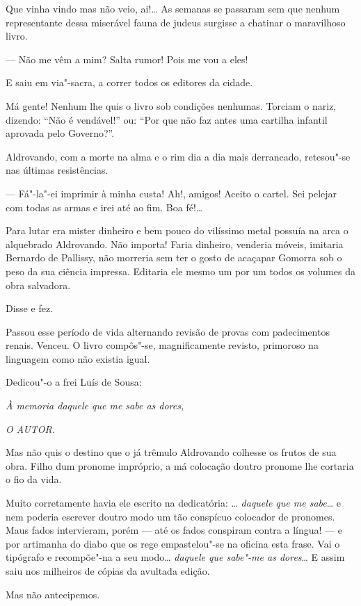 Que vinha vindo mas não veio, ai!\ldots{} As semanas se passaram sem que
nenhum representante dessa miserável fauna de judeus surgisse a chatinar
o maravilhoso livro.

--- Não me vêm a mim? Salta rumor! Pois me vou a eles!

E saiu em via"-sacra, a correr todos os editores da cidade.

Má gente! Nenhum lhe quis o livro sob condições nenhumas. Torciam o
nariz, dizendo: ``Não é vendável!'' ou: ``Por que não faz antes uma
cartilha infantil aprovada pelo Governo?''.

Aldrovando, com a morte na alma e o rim dia a dia mais derrancado,
retesou"-se nas últimas resistências.

--- Fá"-la"-ei imprimir à minha custa! Ah!, amigos! Aceito o cartel. Sei
pelejar com todas as armas e irei até ao fim. Boa fé!\ldots{}

Para lutar era mister dinheiro e bem pouco do vilíssimo metal possuía na
arca o alquebrado Aldrovando. Não importa! Faria dinheiro, venderia
móveis, imitaria Bernardo de Pallissy, não morreria sem ter o gosto de
acaçapar Gomorra sob o peso da sua ciência impressa. Editaria ele mesmo
um por um todos os volumes da obra salvadora.

Disse e fez.

Passou esse período de vida alternando revisão de provas com
padecimentos renais. Venceu. O livro compôs"-se, magnificamente revisto,
primoroso na linguagem como não existia igual.

Dedicou"-o a frei Luís de Sousa:

\emph{À memoria daquele que me sabe as dores,}

\emph{O AUTOR.}

Mas não quis o destino que o já trêmulo Aldrovando colhesse os frutos de
sua obra. Filho dum pronome impróprio, a má colocação doutro pronome lhe
cortaria o fio da vida.

Muito corretamente havia ele escrito na dedicatória: \ldots{} \emph{daquele
que me sabe}\ldots{} e nem poderia escrever doutro modo um tão conspícuo
colocador de pronomes. Maus fados intervieram, porém --- até os fados
conspiram contra a língua! --- e por artimanha do diabo que os rege
empastelou"-se na oficina esta frase. Vai o tipógrafo e recompõe"-na a seu
modo\ldots{} \emph{daquele que sabe"-me as dores}\ldots{} E assim saiu nos
milheiros de cópias da avultada edição.

Mas não antecipemos.

